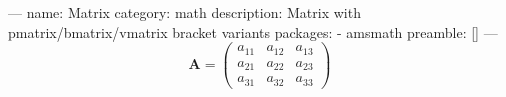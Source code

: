 ---
name: Matrix
category: math
description: Matrix with pmatrix/bmatrix/vmatrix bracket variants
packages:
  - amsmath
preamble: []
---
\[
\mathbf{A} = \begin{pmatrix}
  a_{11} & a_{12} & a_{13} \\
  a_{21} & a_{22} & a_{23} \\
  a_{31} & a_{32} & a_{33}
\end{pmatrix}
\]

